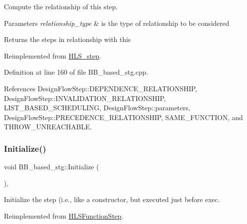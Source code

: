 Compute the relationship of this step. 


\begin{DoxyParams}{Parameters}
{\em relationship\+\_\+type} & is the type of relationship to be considered \\
\hline
\end{DoxyParams}
\begin{DoxyReturn}{Returns}
the steps in relationship with this 
\end{DoxyReturn}


Reimplemented from \hyperlink{classHLS__step_aed0ce8cca9a1ef18e705fc1032ad4de5}{H\+L\+S\+\_\+step}.



Definition at line 160 of file B\+B\+\_\+based\+\_\+stg.\+cpp.



References Design\+Flow\+Step\+::\+D\+E\+P\+E\+N\+D\+E\+N\+C\+E\+\_\+\+R\+E\+L\+A\+T\+I\+O\+N\+S\+H\+IP, Design\+Flow\+Step\+::\+I\+N\+V\+A\+L\+I\+D\+A\+T\+I\+O\+N\+\_\+\+R\+E\+L\+A\+T\+I\+O\+N\+S\+H\+IP, L\+I\+S\+T\+\_\+\+B\+A\+S\+E\+D\+\_\+\+S\+C\+H\+E\+D\+U\+L\+I\+NG, Design\+Flow\+Step\+::parameters, Design\+Flow\+Step\+::\+P\+R\+E\+C\+E\+D\+E\+N\+C\+E\+\_\+\+R\+E\+L\+A\+T\+I\+O\+N\+S\+H\+IP, S\+A\+M\+E\+\_\+\+F\+U\+N\+C\+T\+I\+ON, and T\+H\+R\+O\+W\+\_\+\+U\+N\+R\+E\+A\+C\+H\+A\+B\+LE.

\mbox{\label{classBB__based__stg_a68123e6fdc9a397be06ee3058e217ff0}} 
\subsubsection{\texorpdfstring{Initialize()}{Initialize()}}
{\footnotesize\ttfamily void B\+B\+\_\+based\+\_\+stg\+::\+Initialize (\begin{DoxyParamCaption}{ }\end{DoxyParamCaption})\hspace{0.3cm}{\ttfamily [override]}, {\ttfamily [virtual]}}



Initialize the step (i.\+e., like a constructor, but executed just before exec. 



Reimplemented from \hyperlink{classHLSFunctionStep_a966629ba62a8188ff4fa783ab0d4e319}{H\+L\+S\+Function\+Step}.



